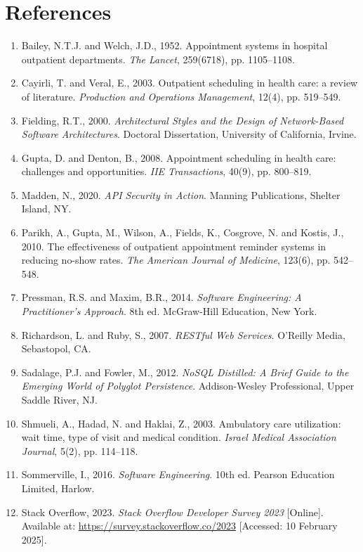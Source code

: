 \chapter*{References}
\begin{enumerate}
    \renewcommand{\labelenumi}{[\theenumi]}
    \item Bailey, N.T.J. and Welch, J.D., 1952. Appointment systems in hospital outpatient departments. \textit{The Lancet}, 259(6718), pp. 1105--1108.
    \item Cayirli, T. and Veral, E., 2003. Outpatient scheduling in health care: a review of literature. \textit{Production and Operations Management}, 12(4), pp. 519--549.
    \item Fielding, R.T., 2000. \textit{Architectural Styles and the Design of Network-Based Software Architectures}. Doctoral Dissertation, University of California, Irvine.
    \item Gupta, D. and Denton, B., 2008. Appointment scheduling in health care: challenges and opportunities. \textit{IIE Transactions}, 40(9), pp. 800--819.
    \item Madden, N., 2020. \textit{API Security in Action}. Manning Publications, Shelter Island, NY.
    \item Parikh, A., Gupta, M., Wilson, A., Fields, K., Cosgrove, N. and Kostis, J., 2010. The effectiveness of outpatient appointment reminder systems in reducing no-show rates. \textit{The American Journal of Medicine}, 123(6), pp. 542--548.
    \item Pressman, R.S. and Maxim, B.R., 2014. \textit{Software Engineering: A Practitioner's Approach}. 8th ed. McGraw-Hill Education, New York.
    \item Richardson, L. and Ruby, S., 2007. \textit{RESTful Web Services}. O'Reilly Media, Sebastopol, CA.
    \item Sadalage, P.J. and Fowler, M., 2012. \textit{NoSQL Distilled: A Brief Guide to the Emerging World of Polyglot Persistence}. Addison-Wesley Professional, Upper Saddle River, NJ.
    \item Shmueli, A., Hadad, N. and Haklai, Z., 2003. Ambulatory care utilization: wait time, type of visit and medical condition. \textit{Israel Medical Association Journal}, 5(2), pp. 114--118.
    \item Sommerville, I., 2016. \textit{Software Engineering}. 10th ed. Pearson Education Limited, Harlow.
    \item Stack Overflow, 2023. \textit{Stack Overflow Developer Survey 2023} [Online]. Available at: \url{https://survey.stackoverflow.co/2023} [Accessed: 10 February 2025].

\end{enumerate}
